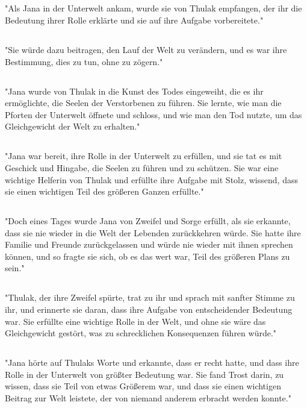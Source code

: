\documentclass{article}
\begin{document}
\subsection{}
"Als Jana in der Unterwelt ankam, wurde sie von Thulak empfangen, der ihr die Bedeutung ihrer Rolle erklärte und sie auf ihre Aufgabe vorbereitete."
\subsection{}
"Sie würde dazu beitragen, den Lauf der Welt zu verändern, und es war ihre Bestimmung, dies zu tun, ohne zu zögern."
\subsection{}
"Jana wurde von Thulak in die Kunst des Todes eingeweiht, die es ihr ermöglichte, die Seelen der Verstorbenen zu führen. Sie lernte, wie man die Pforten der Unterwelt öffnete und schloss, und wie man den Tod nutzte, um das Gleichgewicht der Welt zu erhalten."
\subsection{}
"Jana war bereit, ihre Rolle in der Unterwelt zu erfüllen, und sie tat es mit Geschick und Hingabe, die Seelen zu führen und zu schützen. Sie war eine wichtige Helferin von Thulak und erfüllte ihre Aufgabe mit Stolz, wissend, dass sie einen wichtigen Teil des größeren Ganzen erfüllte."
\subsection{}
"Doch eines Tages wurde Jana von Zweifel und Sorge erfüllt, als sie erkannte, dass sie nie wieder in die Welt der Lebenden zurückkehren würde. Sie hatte ihre Familie und Freunde zurückgelassen und würde nie wieder mit ihnen sprechen können, und so fragte sie sich, ob es das wert war, Teil des größeren Plans zu sein."
\subsection{}
"Thulak, der ihre Zweifel spürte, trat zu ihr und sprach mit sanfter Stimme zu ihr, und erinnerte sie daran, dass ihre Aufgabe von entscheidender Bedeutung war. Sie erfüllte eine wichtige Rolle in der Welt, und ohne sie wäre das Gleichgewicht gestört, was zu schrecklichen Konsequenzen führen würde."
\subsection{}
"Jana hörte auf Thulaks Worte und erkannte, dass er recht hatte, und dass ihre Rolle in der Unterwelt von größter Bedeutung war. Sie fand Trost darin, zu wissen, dass sie Teil von etwas Größerem war, und dass sie einen wichtigen Beitrag zur Welt leistete, der von niemand anderem erbracht werden konnte."
\end{document}
